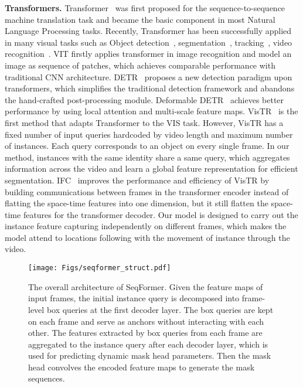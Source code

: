 \documentclass[runningheads]{llncs}
\begin{document}
\noindent\textbf{Transformers.}
Transformer~\cite{transformers} was first proposed for the sequence-to-sequence machine translation task and became the basic component in most Natural Language Processing tasks. Recently, Transformer has been successfully applied in many visual tasks such as Object detection~\cite{detr,deformableDETR,sparsercnn}, segmentation~\cite{segformer,SETR,VisTR,referformer}, tracking~\cite{trackformer,transtrack,STARK}, video recognition~\cite{MotionFormer,uniformer,arnab2021vivit,ActionDetection}.
VIT\cite{VIT} firstly applies transformer in image recognition and model an image as sequence of patches, which achieves comparable performance with traditional CNN architecture. 
DETR~\cite{detr} proposes a new detection paradigm upon transformers, which simplifies the traditional detection framework and abandons the hand-crafted post-processing module. Deformable DETR~\cite{deformableDETR} achieves better performance by using local attention and multi-scale feature maps. VisTR~\cite{VisTR} is the first method that adapts Transformer to the VIS task. However, VisTR has a fixed number of input queries hardcoded by video length and maximum number of instances. Each query corresponds to an object on every single frame. In our method, instances with the same identity share a same query, which aggregates information across the video and learn a global feature representation for efficient segmentation. 
IFC~\cite{IFC} improves the performance and efficiency of VisTR by building communications between frames in the transformer encoder instead of flatting the space-time features into one dimension, but it still flatten the space-time features for the transformer decoder. Our model is designed to carry out the instance feature capturing independently on different frames, which makes the model attend to locations following with the movement of instance through the video.  



\begin{figure*}[tb]
\centering
\texttt{[image: Figs/seqformer\_struct.pdf]}
\caption{The overall architecture of SeqFormer. Given the feature maps of input frames, the initial instance query is decomposed into frame-level box queries at the first decoder layer. The box queries are kept on each frame and serve as anchors without interacting with each other. The features extracted by box queries from each frame are aggregated to the instance query after each decoder layer, which is used for predicting dynamic mask head parameters. Then the mask head convolves the encoded feature maps to generate the mask sequences.  }
\label{fig:architecture}
\end{figure*}
\end{document}
